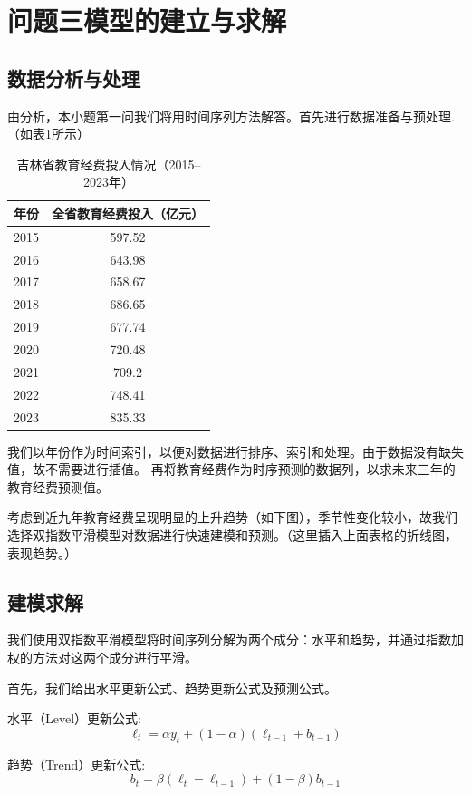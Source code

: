 \documentclass[UTF8, zihao=-4]{ctexart}
\begin{document}
\section{问题三模型的建立与求解}
\subsection{数据分析与处理}

由分析，本小题第一问我们将用时间序列方法解答。首先进行数据准备与预处理.（如表1所示）
\begin{table}[ht]
    \centering
    \begin{tabular}{|c|c|}
    \hline
    \textbf{年份} & \textbf{全省教育经费投入（亿元）} \\
    \hline
    2015 & 597.52 \\
    2016 & 643.98 \\
    2017 & 658.67 \\
    2018 & 686.65 \\
    2019 & 677.74 \\
    2020 & 720.48 \\
    2021 & 709.2 \\
    2022 & 748.41 \\
    2023 & 835.33 \\
    \hline
    \end{tabular}
    \caption{吉林省教育经费投入情况（2015–2023年）}
    \label{tab:education_budget}
    \end{table}

我们以年份作为时间索引，以便对数据进行排序、索引和处理。由于数据没有缺失值，故不需要进行插值。
再将教育经费作为时序预测的数据列，以求未来三年的教育经费预测值。

考虑到近九年教育经费呈现明显的上升趋势（如下图），季节性变化较小，故我们选择双指数平滑模型对数据进行快速建模和预测。（这里插入上面表格的折线图，表现趋势。）

\subsection{建模求解}
我们使用双指数平滑模型将时间序列分解为两个成分：水平和趋势，并通过指数加权的方法对这两个成分进行平滑。

首先，我们给出水平更新公式、趋势更新公式及预测公式。

水平（Level）更新公式:
\[
\ell_t = \alpha y_t + (1 - \alpha)(\ell_{t-1} + b_{t-1})
\]

趋势（Trend）更新公式:
\[
b_t = \beta (\ell_t - \ell_{t-1}) + (1 - \beta) b_{t-1}
\]
\end{document}
